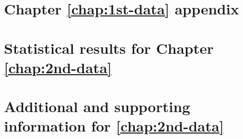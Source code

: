 \documentclass[12pt, a4paper, twoside, openright, final]{report}
\begin{document}

\printbibliography
\printindex %


\chapter[Chapter \ref{chap:1st-data} appendix
       ]{Chapter \ref{chap:1st-data} appendix
       }\label{app:A1_app_name}


\chapter[Statistical results for Chapter \ref{chap:2nd-data}
       ]{Statistical results for Chapter \ref{chap:2nd-data}
       }\label{app:A2_app_name}


\chapter[Chapter \ref{chap:2nd-data} appendix
       ]{Additional and supporting information for \ref{chap:2nd-data}
       }\label{app:A3_app_name}

\end{document}
